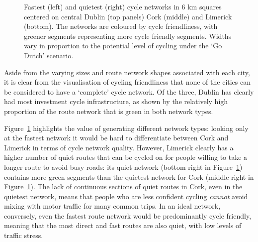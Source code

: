 \documentclass[
  super,
  preprint,
  3p]{elsarticle}
\begin{document}
\begin{figure}


\caption{\label{fig-city-results}Fastest (left) and quietest (right)
cycle networks in 6 km squares centered on central Dublin (top panels)
Cork (middle) and Limerick (bottom). The networks are coloured by cycle
friendliness, with greener segments representing more cycle friendly
segments. Widths vary in proportion to the potential level of cycling
under the `Go Dutch' scenario.}

\end{figure}%

Aside from the varying sizes and route network shapes associated with
each city, it is clear from the visualisation of cycling friendliness
that none of the cities can be considered to have a `complete' cycle
network. Of the three, Dublin has clearly had most investment cycle
infrastructure, as shown by the relatively high proportion of the route
network that is green in both network types.

Figure~\ref{fig-city-results} highlights the value of generating
different network types: looking only at the fastest network it would be
hard to differentiate between Cork and Limerick in terms of cycle
network quality. However, Limerick clearly has a higher number of quiet
routes that can be cycled on for people willing to take a longer route
to avoid busy roads: its quiet network (bottom right in
Figure~\ref{fig-city-results}) contains more green segments than the
quietest network for Cork (middle right in
Figure~\ref{fig-city-results}). The lack of continuous sections of quiet
routes in Cork, even in the quietest network, means that people who are
less confident cycling \emph{cannot} avoid mixing with motor traffic for
many common trips. In an ideal network, conversely, even the fastest
route network would be predominantly cycle friendly, meaning that the
most direct and fast routes are also quiet, with low levels of traffic
stress.
\end{document}
